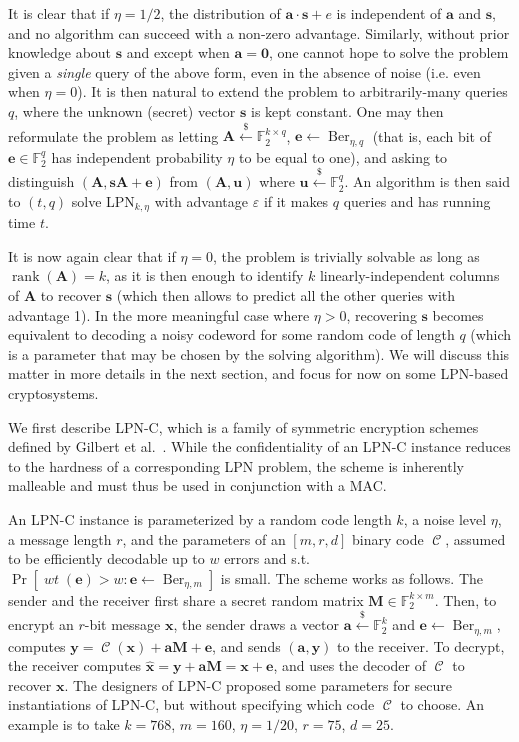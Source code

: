 \documentclass[11pt,a4paper]{article}
\theoremstyle{definition}
\DeclareMathOperator\code{\mathcal{C}}
\DeclareMathOperator\wt{\mathit{wt}}
\DeclareMathOperator\Ber{Ber}
\DeclareMathOperator\rank{rank}
\newcommand\ftwo{\mathbb{F}_{2}}
\newcommand\randraw{\xleftarrow{{\scriptscriptstyle\$}}}
\begin{document}
It is clear that if $\eta = 1/2$, the distribution of $\bm{a}\cdot\bm{s} + e$ is independent of $\bm{a}$ and $\bm{s}$, and no algorithm
can succeed with a non-zero advantage. Similarly, without prior knowledge about $\bm{s}$ and except when $\bm{a} = \bm{0}$, one cannot hope
to solve the problem given a \emph{single} query of the above form, even in the absence of noise (i.e. even when $\eta = 0$). It is then natural to extend the problem to arbitrarily-many queries $q$, where
the unknown (secret) vector $\bm{s}$ is kept constant. One may then reformulate the problem as letting $\bm{A} \randraw \ftwo^{k\times q}$,
$\bm{e} \leftarrow \Ber_{\eta,q}$ (that is, each bit of $\bm{e} \in \ftwo^q$ has independent probability $\eta$ to be equal to one), and asking to distinguish
$(\bm{A},\bm{s}\bm{A} + \bm{e})$ from $(\bm{A}, \bm{u})$ where $\bm{u} \randraw \ftwo^q$. An algorithm is then said to $(t,q)$ solve LPN$_{k,\eta}$ with advantage $\varepsilon$
if it makes $q$ queries and has running time $t$.

It is now again clear that if $\eta = 0$, the problem is trivially solvable as long as $\rank(\bm{A}) = k$, as it is then enough to identify $k$ linearly-independent columns of $\bm{A}$ to recover
$\bm{s}$ (which then allows to predict all the other queries with advantage 1). In the more meaningful case where $\eta > 0$, recovering $\bm{s}$ becomes equivalent to decoding a noisy codeword for
some random code of length $q$ (which is a parameter that may be chosen by the solving algorithm).
We will discuss this matter in more details in the next section, and focus for now on some LPN-based cryptosystems.

\medskip

We first describe LPN-C, which is a family of symmetric encryption schemes defined by Gilbert et al.~\cite{LPNC}. While the confidentiality of an LPN-C instance reduces to the hardness of a corresponding
LPN problem, the scheme is inherently malleable and must thus be used in conjunction with a MAC.

An LPN-C instance is parameterized by a random code length $k$, a noise level $\eta$, a message length $r$, and the parameters of an $[m,r,d]$ binary code $\code$, assumed to be efficiently decodable up to $w$ errors and s.t. $\Pr[\wt(\bm{e}) > w : \bm{e} \leftarrow \Ber_{\eta,m}]$
is small.
The scheme works as follows. The sender and the receiver first share a secret random matrix $\bm{M} \in \ftwo^{k\times m}$. Then, to encrypt an $r$-bit message $\bm{x}$, the sender
draws a vector $\bm{a} \randraw \ftwo^k$ and $\bm{e} \leftarrow \Ber_{\eta,m}$, computes $\bm{y} = \code(\bm{x}) + \bm{a}\bm{M} + \bm{e}$, and sends $(\bm{a},\bm{y})$ to the receiver.
To decrypt, the receiver computes $\hat{\bm{x}} = \bm{y} + \bm{a}\bm{M} = \bm{x} + \bm{e}$, and uses the decoder of $\code$ to recover $\bm{x}$.
The designers of LPN-C proposed some parameters for secure instantiations of LPN-C, but without specifying which code $\code$ to choose. An example is to take $k = 768$, $m = 160$, $\eta = 1/20$, $r = 75$, $d = 25$.
\end{document}
